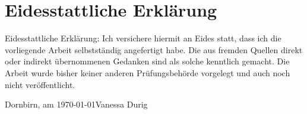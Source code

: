 \chapter*{Eidesstattliche Erklärung}
Eidesstattliche Erklärung: 
Ich versichere hiermit an Eides statt, dass ich die vorliegende Arbeit selbstständig angefertigt habe. Die aus fremden Quellen direkt oder indirekt übernommenen Gedanken sind als solche kenntlich gemacht. Die Arbeit wurde bisher keiner anderen Prüfungsbehörde vorgelegt und auch noch nicht veröffentlicht.

\vspace{1cm}
\noindent
Dornbirn, am \today \hfill Vanessa Durig
\newpage